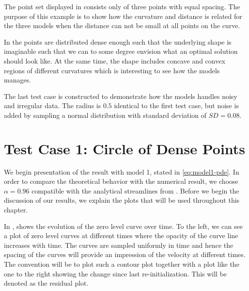The point set displayed in  consists only of three points with equal spacing. The purpose of this example is to show how the curvature and distance is related for the three models when the distance can not be small at all points on the curve. 

In  the points are distributed dense enough such that the underlying shape is imaginable such that we can to some degree envision what an optimal solution should look like. At the same time, the shape includes concave and convex regions of different curvatures which is interesting to see how the models manages.

The last test case is constructed to demonstrate how the models handles noisy and irregular data. The radius is $0.5$ identical to the first test case, but noise is added by sampling a normal distribution with standard deviation of $SD=0.08$.

\section{Test Case 1: Circle of Dense Points}
We begin presentation of the result with model 1, stated in \eqref{eq:model1-pde}. In order to compare the theoretical behavior with the numerical result, we choose $\alpha=0.96$ compatible with the analytical streamlines from . Before we begin the discussion of our results, we explain the plots that will be used throughout this chapter.

In , shows the evolution of the zero level curve over time. To the left, we can see a plot of zero level curves at different times where the opacity of the curve line increases with time. The curves are sampled uniformly in time and hence the spacing of the curves will provide an impression of the velocity at different times. The convention will be to plot such a contour plot together with a plot like the one to the right showing the change since last re-initialization. This will be denoted as the residual plot.

